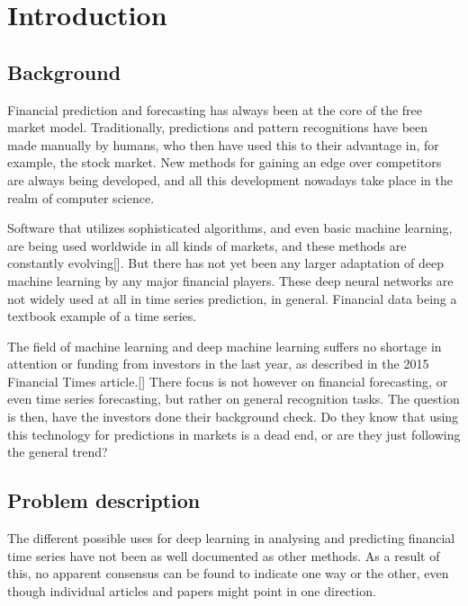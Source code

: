 \section{Introduction}

\subsection{Background}

Financial prediction and forecasting has always been at the core of the free market model. Traditionally, predictions and pattern recognitions have been made manually by humans, who then have used this to their advantage in, for example, the stock market. New methods for gaining an edge over competitors are always being developed, and all this development nowadays take place in the realm of computer science.

Software that utilizes sophisticated algorithms, and even basic machine learning, are being used worldwide in all kinds of markets, and these methods are constantly evolving[]. But there has not yet been any larger adaptation of deep machine learning by any major financial players. These deep neural networks are not widely used at all in time series prediction, in general. Financial data being a textbook example of a time series.

The field of machine learning and deep machine learning suffers no shortage in attention or funding from investors in the last year, as described in the 2015 Financial Times article.[] There focus is not however on financial forecasting, or even time series forecasting, but rather on general recognition tasks. The question is then, have the investors done their background check. Do they know that using this technology for predictions in markets is a dead end, or are they just following the general trend?

\subsection{Problem description}


The different possible uses for deep learning in analysing and predicting financial time series have not been as well documented as other methods. As a result of this, no apparent consensus can be found to indicate one way or the other, even though individual articles and papers might point in one direction.

